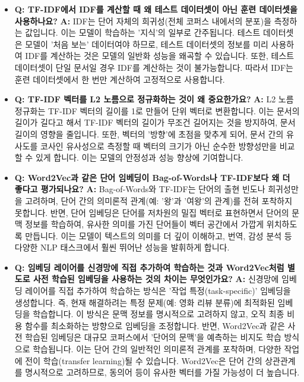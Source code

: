 \documentclass[11pt,a4paper]{article}
\theoremstyle{definition}
\begin{document}
\begin{itemize}
    \item \textbf{Q: TF-IDF에서 IDF를 계산할 때 왜 테스트 데이터셋이 아닌 훈련 데이터셋을 사용하나요?}
    \textbf{A:} IDF는 단어 자체의 희귀성(전체 코퍼스 내에서의 분포)을 측정하는 값입니다. 이는 모델이 학습하는 '지식'의 일부로 간주됩니다. 테스트 데이터셋은 모델이 '처음 보는' 데이터여야 하므로, 테스트 데이터셋의 정보를 미리 사용하여 IDF를 계산하는 것은 모델의 일반화 성능을 왜곡할 수 있습니다. 또한, 테스트 데이터셋이 단일 문서일 경우 IDF를 계산하는 것이 불가능합니다. 따라서 IDF는 훈련 데이터셋에서 한 번만 계산하여 고정적으로 사용합니다.

    \item \textbf{Q: TF-IDF 벡터를 L2 노름으로 정규화하는 것이 왜 중요한가요?}
    \textbf{A:} L2 노름 정규화는 TF-IDF 벡터의 길이를 1로 만들어 단위 벡터로 변환합니다. 이는 문서의 길이가 길다고 해서 TF-IDF 벡터의 길이가 무조건 길어지는 것을 방지하여, 문서 길이의 영향을 줄입니다. 또한, 벡터의 '방향'에 초점을 맞추게 되어, 문서 간의 유사도를 코사인 유사성으로 측정할 때 벡터의 크기가 아닌 순수한 방향성만을 비교할 수 있게 합니다. 이는 모델의 안정성과 성능 향상에 기여합니다.

    \item \textbf{Q: Word2Vec과 같은 단어 임베딩이 Bag-of-Words나 TF-IDF보다 왜 더 좋다고 평가되나요?}
    \textbf{A:} Bag-of-Words와 TF-IDF는 단어의 출현 빈도나 희귀성만을 고려하며, 단어 간의 의미론적 관계(예: '왕'과 '여왕'의 관계)를 전혀 포착하지 못합니다. 반면, 단어 임베딩은 단어를 저차원의 밀집 벡터로 표현하면서 단어의 문맥 정보를 학습하여, 유사한 의미를 가진 단어들이 벡터 공간에서 가깝게 위치하도록 만듭니다. 이는 모델이 텍스트의 의미를 더 깊이 이해하고, 번역, 감성 분석 등 다양한 NLP 태스크에서 훨씬 뛰어난 성능을 발휘하게 합니다.

    \item \textbf{Q: 임베딩 레이어를 신경망에 직접 추가하여 학습하는 것과 Word2Vec처럼 별도로 사전 학습된 임베딩을 사용하는 것의 차이는 무엇인가요?}
    \textbf{A:} 신경망에 임베딩 레이어를 직접 추가하여 학습하는 방식은 '작업 특정(task-specific)' 임베딩을 생성합니다. 즉, 현재 해결하려는 특정 문제(예: 영화 리뷰 분류)에 최적화된 임베딩을 학습합니다. 이 방식은 문맥 정보를 명시적으로 고려하지 않고, 오직 최종 비용 함수를 최소화하는 방향으로 임베딩을 조정합니다. 반면, Word2Vec과 같은 사전 학습된 임베딩은 대규모 코퍼스에서 '단어의 문맥'을 예측하는 비지도 학습 방식으로 학습됩니다. 이는 단어 간의 일반적인 의미론적 관계를 포착하며, 다양한 작업에 전이 학습(transfer learning)될 수 있습니다. Word2Vec은 단어 간의 상관관계를 명시적으로 고려하므로, 동의어 등이 유사한 벡터를 가질 가능성이 더 높습니다.


\end{itemize}
\end{document}
